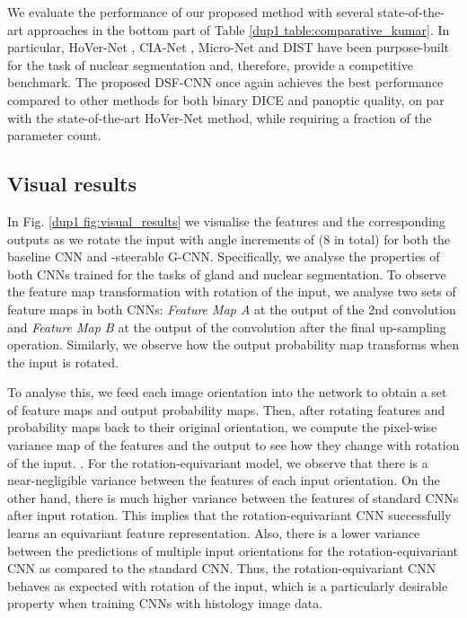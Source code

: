 \documentclass[journal]{IEEEtran}
\newcommand\mg[1]{{\color{black}{#1}}}
\begin{document}
	    We evaluate the performance of our proposed method with several state-of-the-art approaches in the bottom part of Table \ref{dup1 table:comparative_kumar}. In particular, HoVer-Net \cite{graham2019hover}, CIA-Net \cite{zhou2019cia}, Micro-Net \cite{raza2019micro} and DIST \cite{naylor2018segmentation} have been purpose-built for the task of nuclear segmentation and, therefore, provide a competitive benchmark. The proposed DSF-CNN once again achieves the best performance compared to other methods for both binary DICE and panoptic quality, on par with the state-of-the-art HoVer-Net method, while requiring a fraction of the parameter count.
	    
	    \subsection{Visual results} \label{dup1 section:comparison_equiv_viz}
	    In Fig. \ref{dup1 fig:visual_results} we visualise the features and the corresponding outputs as we rotate the input with angle increments of  (8 in total) for both the baseline CNN and -steerable G-CNN. Specifically, we analyse the properties of both CNNs trained for the tasks of gland and nuclear segmentation.
To observe the feature map transformation with rotation of the input, we analyse two sets of feature maps in both CNNs: {\em Feature Map A} at the output of the 2nd convolution and {\em Feature Map B} at the output of the convolution after the final up-sampling operation. 
Similarly, we observe how the output probability map transforms when the input is rotated. 
	    
	    To analyse this, we feed each image orientation into the network to obtain a set of feature maps and output probability maps. Then, after rotating features and probability maps back to their original orientation, we compute the pixel-wise variance map of the features and the output to see how they change with rotation of the input. \mg{-CNN feature maps are a function on  and therefore we visualise a single planar feature map within the group}. For the rotation-equivariant model, we observe that there is a near-negligible variance between the features of each input orientation. On the other hand, there is much higher variance between the features of standard CNNs after input rotation. This implies that the rotation-equivariant CNN successfully learns an equivariant feature representation. Also, there is a lower variance between the predictions of multiple input orientations for the rotation-equivariant CNN as compared to the standard CNN. Thus, the rotation-equivariant CNN behaves as expected with rotation of the input, which is a particularly desirable property when training CNNs with histology image data. \mg{It must be noted that features learned by conventional CNNs are highly complex and it is very difficult to infer the relationship between learned features and input rotation. Nonetheless, we demonstrate that rotation-equivariant CNNs have a predictable transformation with input rotation, making them more stable than conventional CNNs.}
	    
\end{document}
